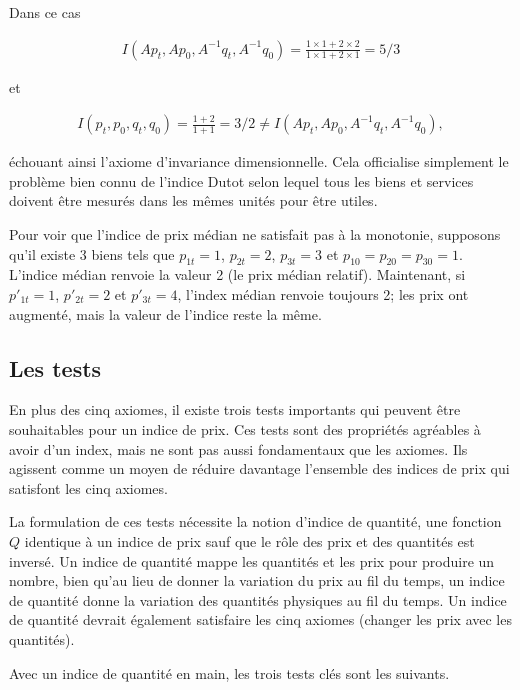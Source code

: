 \documentclass[]{article}
\begin{document}
Dans ce cas

\begin{align*}
I(Ap_{t}, Ap_{0}, A^{- 1} q_{t}, A^{- 1} q_{0}) = \frac{1 \times 1 + 2 \times 2}{1 \times 1 + 2 \times 1} = 5/3
\end{align*}

et

\begin{align*}
I(p_{t}, p_{0}, q_{t}, q_{0}) = \frac{1 + 2}{1 + 1} = 3/2 \neq I(Ap_{t}, Ap_{0}, A^{-1} q_{t}, A^{-1} q_{0}),
\end{align*}

échouant ainsi l'axiome d'invariance dimensionnelle. Cela officialise simplement le problème bien connu de l'indice Dutot selon lequel tous les biens et services doivent être mesurés dans les mêmes unités pour être utiles.

Pour voir que l'indice de prix médian ne satisfait pas à la monotonie, supposons qu'il existe 3 biens tels que \(p_{1t} = 1\), \(p_{2t} = 2\), \(p_{3t} = 3\) et \(p_{10} = p_{20} = p_{30} = 1\). L'indice médian renvoie la valeur 2 (le prix médian relatif). Maintenant, si \(p'_{1t} = 1\), \(p' _{2t} = 2\) et \(p'_{3t} = 4\), l'index médian renvoie toujours 2; les prix ont augmenté, mais la valeur de l'indice reste la même.

\hypertarget{les-tests}{%
\subsection{Les tests}\label{les-tests}}

En plus des cinq axiomes, il existe trois tests importants qui peuvent être souhaitables pour un indice de prix. Ces tests sont des propriétés agréables à avoir d'un index, mais ne sont pas aussi fondamentaux que les axiomes. Ils agissent comme un moyen de réduire davantage l'ensemble des indices de prix qui satisfont les cinq axiomes.

La formulation de ces tests nécessite la notion d'indice de quantité, une fonction \(Q\) identique à un indice de prix sauf que le rôle des prix et des quantités est inversé. Un indice de quantité mappe les quantités et les prix pour produire un nombre, bien qu'au lieu de donner la variation du prix au fil du temps, un indice de quantité donne la variation des quantités physiques au fil du temps. Un indice de quantité devrait également satisfaire les cinq axiomes (changer les prix avec les quantités).

Avec un indice de quantité en main, les trois tests clés sont les suivants.
\end{document}
